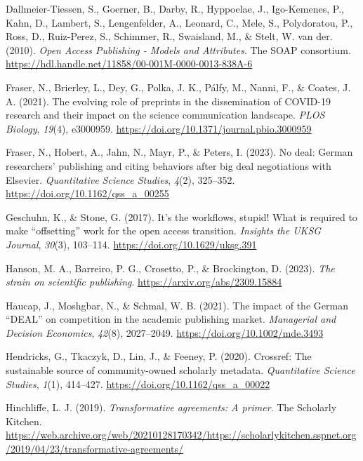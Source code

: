 \documentclass[a4paper,man,floatsintext,longtable,noextraspace,12pt]{apa6}
\newenvironment{CSLReferences}%
  {}%
  {\par}
\begin{document}
\begin{CSLReferences}{1}{0}
\leavevmode{}%
Dallmeier-Tiessen, S., Goerner, B., Darby, R., Hyppoelae, J.,
Igo-Kemenes, P., Kahn, D., Lambert, S., Lengenfelder, A., Leonard, C.,
Mele, S., Polydoratou, P., Ross, D., Ruiz-Perez, S., Schimmer, R.,
Swaisland, M., \& Stelt, W. van der. (2010). \emph{{Open Access
Publishing - Models and Attributes}}. The SOAP consortium.
\url{https://hdl.handle.net/11858/00-001M-0000-0013-838A-6}

\leavevmode{}%
Fraser, N., Brierley, L., Dey, G., Polka, J. K., Pálfy, M., Nanni, F.,
\& Coates, J. A. (2021). The evolving role of preprints in the
dissemination of COVID-19 research and their impact on the science
communication landscape. \emph{PLOS Biology}, \emph{19}(4), e3000959.
\url{https://doi.org/10.1371/journal.pbio.3000959}

\leavevmode{}%
Fraser, N., Hobert, A., Jahn, N., Mayr, P., \& Peters, I. (2023). No
deal: German researchers' publishing and citing behaviors after big deal
negotiations with {Elsevier}. \emph{Quantitative Science Studies},
\emph{4}(2), 325--352. \url{https://doi.org/10.1162/qss_a_00255}

\leavevmode{}%
Geschuhn, K., \& Stone, G. (2017). It's the workflows, stupid! What is
required to make {``offsetting''} work for the open access transition.
\emph{Insights the {UKSG} Journal}, \emph{30}(3), 103--114.
\url{https://doi.org/10.1629/uksg.391}

\leavevmode{}%
Hanson, M. A., Barreiro, P. G., Crosetto, P., \& Brockington, D. (2023).
\emph{The strain on scientific publishing}.
\url{https://arxiv.org/abs/2309.15884}

\leavevmode{}%
Haucap, J., Moshgbar, N., \& Schmal, W. B. (2021). The impact of the
{German {``DEAL''}} on competition in the academic publishing market.
\emph{Managerial and Decision Economics}, \emph{42}(8), 2027--2049.
\url{https://doi.org/10.1002/mde.3493}

\leavevmode{}%
Hendricks, G., Tkaczyk, D., Lin, J., \& Feeney, P. (2020). Crossref: The
sustainable source of community-owned scholarly metadata.
\emph{Quantitative Science Studies}, \emph{1}(1), 414--427.
\url{https://doi.org/10.1162/qss_a_00022}

\leavevmode{}%
Hinchliffe, L. J. (2019). \emph{Transformative agreements: A primer}.
The Scholarly Kitchen.
\url{https://web.archive.org/web/20210128170342/https://scholarlykitchen.sspnet.org/2019/04/23/transformative-agreements/}


\end{CSLReferences}
\end{document}
